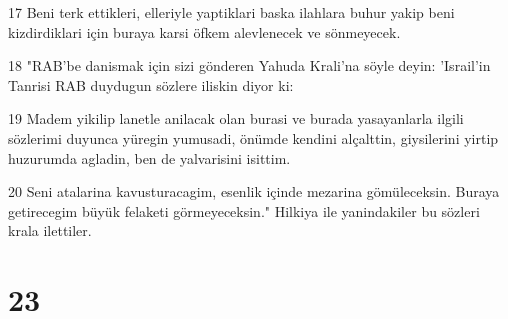 \par 17 Beni terk ettikleri, elleriyle yaptiklari baska ilahlara buhur yakip beni kizdirdiklari için buraya karsi öfkem alevlenecek ve sönmeyecek.
\par 18 "RAB'be danismak için sizi gönderen Yahuda Krali'na söyle deyin: 'Israil'in Tanrisi RAB duydugun sözlere iliskin diyor ki:
\par 19 Madem yikilip lanetle anilacak olan burasi ve burada yasayanlarla ilgili sözlerimi duyunca yüregin yumusadi, önümde kendini alçalttin, giysilerini yirtip huzurumda agladin, ben de yalvarisini isittim.
\par 20 Seni atalarina kavusturacagim, esenlik içinde mezarina gömüleceksin. Buraya getirecegim büyük felaketi görmeyeceksin." Hilkiya ile yanindakiler bu sözleri krala ilettiler.

\chapter{23}


